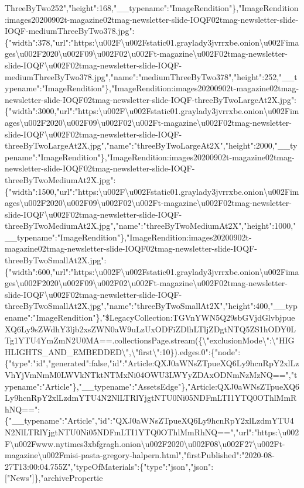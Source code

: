 ThreeByTwo252","height":168,"\_\_typename":"ImageRendition"\},"ImageRendition:images20200902t-magazine02tmag-newsletter-slide-IOQF02tmag-newsletter-slide-IOQF-mediumThreeByTwo378.jpg":\{"width":378,"url":"https:\textbackslash{}u002F\textbackslash{}u002Fstatic01.graylady3jvrrxbe.onion\textbackslash{}u002Fimages\textbackslash{}u002F2020\textbackslash{}u002F09\textbackslash{}u002F02\textbackslash{}u002Ft-magazine\textbackslash{}u002F02tmag-newsletter-slide-IOQF\textbackslash{}u002F02tmag-newsletter-slide-IOQF-mediumThreeByTwo378.jpg","name":"mediumThreeByTwo378","height":252,"\_\_typename":"ImageRendition"\},"ImageRendition:images20200902t-magazine02tmag-newsletter-slide-IOQF02tmag-newsletter-slide-IOQF-threeByTwoLargeAt2X.jpg":\{"width":3000,"url":"https:\textbackslash{}u002F\textbackslash{}u002Fstatic01.graylady3jvrrxbe.onion\textbackslash{}u002Fimages\textbackslash{}u002F2020\textbackslash{}u002F09\textbackslash{}u002F02\textbackslash{}u002Ft-magazine\textbackslash{}u002F02tmag-newsletter-slide-IOQF\textbackslash{}u002F02tmag-newsletter-slide-IOQF-threeByTwoLargeAt2X.jpg","name":"threeByTwoLargeAt2X","height":2000,"\_\_typename":"ImageRendition"\},"ImageRendition:images20200902t-magazine02tmag-newsletter-slide-IOQF02tmag-newsletter-slide-IOQF-threeByTwoMediumAt2X.jpg":\{"width":1500,"url":"https:\textbackslash{}u002F\textbackslash{}u002Fstatic01.graylady3jvrrxbe.onion\textbackslash{}u002Fimages\textbackslash{}u002F2020\textbackslash{}u002F09\textbackslash{}u002F02\textbackslash{}u002Ft-magazine\textbackslash{}u002F02tmag-newsletter-slide-IOQF\textbackslash{}u002F02tmag-newsletter-slide-IOQF-threeByTwoMediumAt2X.jpg","name":"threeByTwoMediumAt2X","height":1000,"\_\_typename":"ImageRendition"\},"ImageRendition:images20200902t-magazine02tmag-newsletter-slide-IOQF02tmag-newsletter-slide-IOQF-threeByTwoSmallAt2X.jpg":\{"width":600,"url":"https:\textbackslash{}u002F\textbackslash{}u002Fstatic01.graylady3jvrrxbe.onion\textbackslash{}u002Fimages\textbackslash{}u002F2020\textbackslash{}u002F09\textbackslash{}u002F02\textbackslash{}u002Ft-magazine\textbackslash{}u002F02tmag-newsletter-slide-IOQF\textbackslash{}u002F02tmag-newsletter-slide-IOQF-threeByTwoSmallAt2X.jpg","name":"threeByTwoSmallAt2X","height":400,"\_\_typename":"ImageRendition"\},"\$LegacyCollection:TGVnYWN5Q29sbGVjdGlvbjpueXQ6Ly9sZWdhY3ljb2xsZWN0aW9uLzUxODFiZDlhLTljZDgtNTQ5ZS1hODY0LTg1YTU4YmZmN2U0MA==.collectionsPage.stream(\{\textbackslash{}"exclusionMode\textbackslash{}":\textbackslash{}"HIGHLIGHTS\_AND\_EMBEDDED\textbackslash{}",\textbackslash{}"first\textbackslash{}":10\}).edges.0":\{"node":\{"type":"id","generated":false,"id":"Article:QXJ0aWNsZTpueXQ6Ly9hcnRpY2xlLzVhYjVmNmM0LWVkNTktNTMxNi04OWU3LWYyZDAxODNmNzMzNQ==","typename":"Article"\},"\_\_typename":"AssetsEdge"\},"Article:QXJ0aWNsZTpueXQ6Ly9hcnRpY2xlLzdmYTU4N2NlLTRlYjgtNTU0Ni05NDFmLTI1YTQ0OThlMmRhNQ==":\{"\_\_typename":"Article","id":"QXJ0aWNsZTpueXQ6Ly9hcnRpY2xlLzdmYTU4N2NlLTRlYjgtNTU0Ni05NDFmLTI1YTQ0OThlMmRhNQ==","url":"https:\textbackslash{}u002F\textbackslash{}u002Fwww.nytimes3xbfgragh.onion\textbackslash{}u002F2020\textbackslash{}u002F08\textbackslash{}u002F27\textbackslash{}u002Ft-magazine\textbackslash{}u002Fmisi-pasta-gregory-halpern.html","firstPublished":"2020-08-27T13:00:04.755Z","typeOfMaterials":\{"type":"json","json":{[}"News"{]}\},"archivePropertie